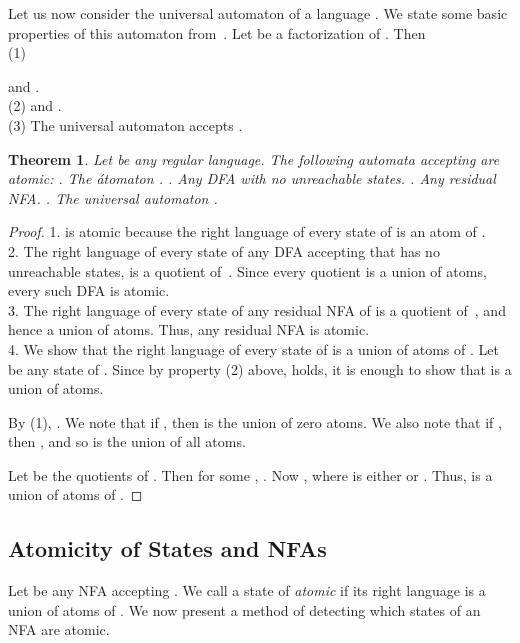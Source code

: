 \documentclass[preprint,12pt]{elsarticle}
\newtheorem{theorem}{Theorem}
\begin{document}
Let us now consider the universal automaton  of
a language . We state some basic properties of this automaton from~\cite{LoSa07}.
Let  be a factorization of .
Then \\
\hglue 10pt (1)
 
and .\\
\hglue 10pt (2)
 and 
.\\
\hglue 10pt (3) The universal automaton  accepts .


\begin{theorem}
\label{thm:univ_atomic}
Let  be any regular language. The following automata accepting  
are atomic:
. The \'atomaton .
. Any DFA with no unreachable states.
. Any residual NFA. 
. The universal automaton .
\end{theorem}
\vspace{-.3cm}
\begin{proof} 
1.  is atomic because the right language of every state of  is an atom of .\\
2. The right language of every state of any DFA accepting  
that has no unreachable states, 
is a quotient of~. Since every quotient is a union of atoms, every such DFA 
is atomic.\\
3. The right language of every state of any residual NFA of  
is a quotient of~, and hence a union of atoms. Thus, any residual NFA is 
atomic.\\
4. We show that the right language of every state  of  is a union 
of atoms of . Let  be any state of .
Since by property (2) above,  holds, it is enough to show 
that  is a union of atoms. 

By (1), . 
We note that if , then  is the union of zero atoms.
We also note that if , then , and so  is the union of 
all atoms.

Let  be the quotients of . 
Then for some , .
Now , where  is either  or . 
Thus,  is a union of atoms of . 
\end{proof}


\subsection{Atomicity of States and NFAs}
\label{sec:detecting}

Let  be any NFA accepting .
We call a state  of  \emph{atomic} if its right language
 is a union of atoms of . 
We now present a method of detecting which states of an NFA
are atomic.
\end{document}

